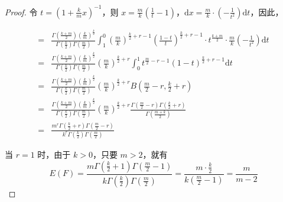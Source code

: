 \documentclass[normal,founder,mtpro2,cn]{elegantnote}
\begin{document}
\begin{enumerate}
\begin{proof}
            令 $t=\left(1+\frac{k}{m} x\right)^{-1}$，则 $x=\frac{m}{k}\left(\frac{1}{t}-1\right)$，$\mathrm{d}x=\frac{m}{k}\cdot\left(-\frac{1}{t^{2}}\right)\mathrm{d}t$，因此，

            \begin{equation*}
                \begin{aligned}
                    = & \frac{\Gamma\left(\frac{k+m}{2}\right)\left(\frac{k}{m}\right)^{\frac{k}{2}}}{\Gamma\left(\frac{k}{2}\right)\Gamma\left(\frac{m}{2}\right)}\int_{1}^{0}\left(\frac{m}{k}\right)^{\frac{k}{2}+r-1}\left(\frac{1-t}{t}\right)^{\frac{k}{2}+r-1}\cdot t^{\frac{k+m}{2}}\cdot\frac{m}{k}\left(-\frac{1}{t^{2}}\right)\mathrm{d}t \\
                    = & \frac{\Gamma\left(\frac{k+m}{2}\right)\left(\frac{k}{m}\right)^{\frac{k}{2}}}{\Gamma\left(\frac{k}{2}\right)\Gamma\left(\frac{m}{2}\right)}\left(\frac{m}{k}\right)^{\frac{k}{2}+r}\int_{0}^{1}t^{\frac{m}{2}-r-1}(1-t)^{\frac{k}{2}+r-1}\mathrm{d}t                                                                         \\
                    = & \frac{\Gamma\left(\frac{k+m}{2}\right)\left(\frac{k}{m}\right)^{\frac{k}{2}}}{\Gamma\left(\frac{k}{2}\right)\Gamma\left(\frac{m}{2}\right)}\left(\frac{m}{k}\right)^{\frac{k}{2}+r}B\left(\frac{m}{2}-r,\frac{k}{2}+r\right)                                                                                                 \\
                    = & \frac{\Gamma\left(\frac{k+m}{2}\right)\left(\frac{k}{m}\right)^{\frac{k}{2}}}{\Gamma\left(\frac{k}{2}\right)\Gamma\left(\frac{m}{2}\right)}\left(\frac{m}{k}\right)^{\frac{k}{2}+r}\frac{\Gamma\left(\frac{m}{2}-r\right)\Gamma\left(\frac{k}{2}+r\right)}{\Gamma\left(\frac{m+k}{2}\right)}                                 \\
                    = & \frac{m^{r}\Gamma\left(\frac{k}{2}+r\right)\Gamma\left(\frac{m}{2}-r\right)}{k^{r}\Gamma\left(\frac{k}{2}\right)\Gamma\left(\frac{m}{2}\right)}
                \end{aligned}
            \end{equation*}

            当 $r=1$ 时，由于 $k>0$，只要 $m>2$，就有
            \begin{equation*}
                E(F)=\frac{m\Gamma\left(\frac{k}{2}+1\right)\Gamma\left(\frac{m}{2}-1\right)}{k\Gamma\left(\frac{k}{2}\right)\Gamma\left(\frac{m}{2}\right)}=\frac{m\cdot\frac{k}{2}}{k\left(\frac{m}{2}-1\right)}=\frac{m}{m-2}
            \end{equation*}


\end{proof}
\end{enumerate}
\end{document}
